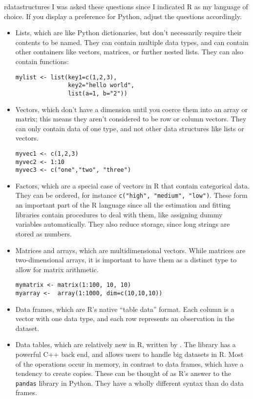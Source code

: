 \begin{subanswer}{rdatastructures}
I was asked these questions since I indicated R as my language of choice.
If you display a preference for Python, adjust the questions accordingly.
\begin{itemize}
  \item Lists, which are like Python dictionaries, but don't necessarily require their contents to be named.
  They can contain multiple data types, and can contain other containers like vectors, matrices, or further nested lists.
  They can also contain functions:
  \begin{verbatim}
mylist <- list(key1=c(1,2,3),
               key2="hello world",
               list(a=1, b="2"))
  \end{verbatim}
  \item Vectors, which don't have a dimension until you coerce them into an array or matrix;
  this means they aren't considered to be row or column vectors.
  They can only contain data of one type, and not other data structures like lists or vectors.
  \begin{verbatim}
myvec1 <- c(1,2,3)
myvec2 <- 1:10
myvec3 <- c("one","two", "three")
  \end{verbatim}
  \item
  Factors, which are a special case of vectors in R that contain categorical data.
  They can be ordered, for instance \verb+c("high", "medium", "low")+.
  These form an important part of the R language since all the estimation and fitting libraries contain procedures to deal with them, like assigning dummy variables automatically.
  They also reduce storage, since long strings are stored as numbers.
  \item Matrices and arrays,
  which are multidimensional vectors.
  While matrices are two-dimensional arrays, it is important to have them as a distinct type to allow for matrix arithmetic.
  \begin{verbatim}
mymatrix <- matrix(1:100, 10, 10)
myarray <-  array(1:1000, dim=c(10,10,10))
  \end{verbatim}
  \item Data frames, which are R's native ``table data'' format.
  Each column is a vector with one data type, and each row represents an observation in the dataset.
  \item Data tables, which are relatively new in R, written by \citet{datatables}.
  The library has a powerful C++ back end, and allows users to handle big datasets in R.
  Most of the operations occur in memory, in contrast to data frames, which have a tendency to create copies.
  These can be thought of as R's answer to the \verb+pandas+ library in Python.
  They have a wholly different syntax than do data frames.
\end{itemize}
\end{subanswer}

